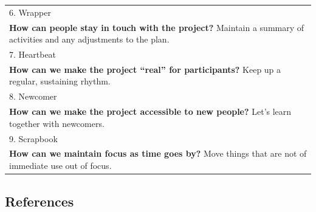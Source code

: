 \begin{longtable}[]{@{}l@{}}
\begin{minipage}[t]{0.97\columnwidth}
6. {{Wrapper}}\strut
\end{minipage}\tabularnewline
\begin{minipage}[t]{0.97\columnwidth}\raggedright
\textbf{How can people stay in touch with the project?} Maintain a
summary of activities and any adjustments to the plan.\strut
\end{minipage}\tabularnewline
\begin{minipage}[t]{0.97\columnwidth}\raggedright
7. {{Heartbeat}}\strut
\end{minipage}\tabularnewline
\begin{minipage}[t]{0.97\columnwidth}\raggedright
\textbf{How can we make the project ``real'' for participants?} Keep up
a regular, sustaining rhythm.\strut
\end{minipage}\tabularnewline
\begin{minipage}[t]{0.97\columnwidth}\raggedright
8. {{Newcomer}}\strut
\end{minipage}\tabularnewline
\begin{minipage}[t]{0.97\columnwidth}\raggedright
\textbf{How can we make the project accessible to new people?} Let's
learn together with newcomers.\strut
\end{minipage}\tabularnewline
\begin{minipage}[t]{0.97\columnwidth}\raggedright
9. {{Scrapbook}}\strut
\end{minipage}\tabularnewline
\begin{minipage}[t]{0.97\columnwidth}\raggedright
\textbf{How can we maintain focus as time goes by?} Move things that are
not of immediate use out of focus.\strut
\end{minipage}\tabularnewline
\bottomrule
\end{longtable}

\hypertarget{references}{%
\subsection{References}\label{references}}

